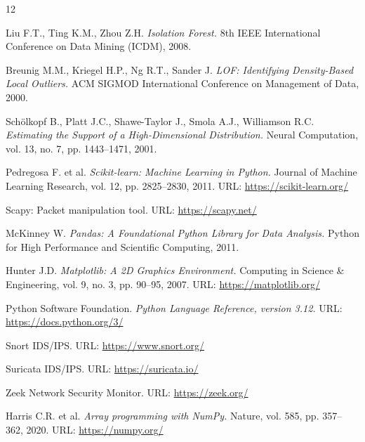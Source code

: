 \begin{thebibliography}{12}

Liu F.T., Ting K.M., Zhou Z.H.
\textit{Isolation Forest.}
8th IEEE International Conference on Data Mining (ICDM), 2008.

Breunig M.M., Kriegel H.P., Ng R.T., Sander J.
\textit{LOF: Identifying Density-Based Local Outliers.}
ACM SIGMOD International Conference on Management of Data, 2000.

Schölkopf B., Platt J.C., Shawe-Taylor J., Smola A.J., Williamson R.C.
\textit{Estimating the Support of a High-Dimensional Distribution.}
Neural Computation, vol. 13, no. 7, pp. 1443--1471, 2001.

Pedregosa F. et al.
\textit{Scikit-learn: Machine Learning in Python.}
Journal of Machine Learning Research, vol. 12, pp. 2825--2830, 2011.
URL: \url{https://scikit-learn.org/}

Scapy: Packet manipulation tool.
URL: \url{https://scapy.net/}

McKinney W.
\textit{Pandas: A Foundational Python Library for Data Analysis.}
Python for High Performance and Scientific Computing, 2011.

Hunter J.D.
\textit{Matplotlib: A 2D Graphics Environment.}
Computing in Science \& Engineering, vol. 9, no. 3, pp. 90--95, 2007.
URL: \url{https://matplotlib.org/}

Python Software Foundation.
\textit{Python Language Reference, version 3.12.}
URL: \url{https://docs.python.org/3/}

Snort IDS/IPS.
URL: \url{https://www.snort.org/}

Suricata IDS/IPS.
URL: \url{https://suricata.io/}

Zeek Network Security Monitor.
URL: \url{https://zeek.org/}

Harris C.R. et al.
\textit{Array programming with NumPy.}
Nature, vol. 585, pp. 357--362, 2020.
URL: \url{https://numpy.org/}

\end{thebibliography}
